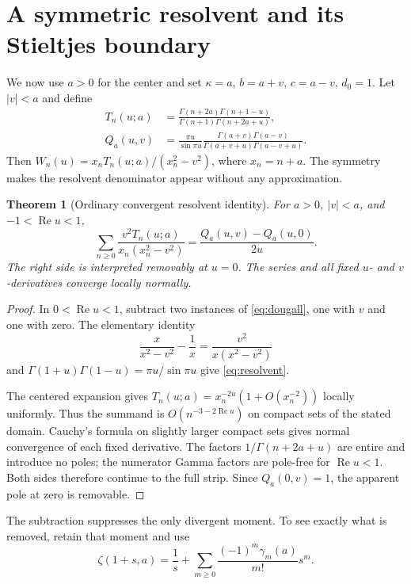 \documentclass[11pt,a4paper]{article}
\numberwithin{equation}{section}
\newtheorem{theorem}{Theorem}[section]
\theoremstyle{definition}\newtheorem{definition}[theorem]{Definition}
\theoremstyle{remark}\newtheorem{remark}[theorem]{Remark}
\newcommand{\Repart}{\operatorname{Re}}
\begin{document}
\section{A symmetric resolvent and its Stieltjes boundary}
\label{sec:resolvent}
We now use $a>0$ for the center and set $\kappa=a$, $b=a+v$,
$c=a-v$, $d_0=1$. Let $|v|<a$ and define
\begin{align}
 T_n(u;a)&=\frac{\Gamma(n+2a)\Gamma(n+1-u)}
                    {\Gamma(n+1)\Gamma(n+2a+u)},\label{eq:Tn}\\
 Q_a(u,v)&=\frac{\pi u}{\sin\pi u}
 \frac{\Gamma(a+v)\Gamma(a-v)}
      {\Gamma(a+v+u)\Gamma(a-v+u)}.\label{eq:Qa}
\end{align}
Then $W_n(u)=x_nT_n(u;a)/(x_n^2-v^2)$, where $x_n=n+a$.
The symmetry makes the resolvent denominator appear without any
approximation.

\begin{theorem}[Ordinary convergent resolvent identity]
\label{thm:resolvent}
For $a>0$, $|v|<a$, and $-1<\Repart u<1$,
\begin{equation}
 \sum_{n\ge0}\frac{v^2T_n(u;a)}{x_n(x_n^2-v^2)}
       =\frac{Q_a(u,v)-Q_a(u,0)}{2u}.
 \label{eq:resolvent}
\end{equation}
The right side is interpreted removably at $u=0$. The series and
all fixed $u$- and $v$-derivatives converge locally normally.
\end{theorem}
\begin{proof}
In $0<\Repart u<1$, subtract two instances of
\eqref{eq:dougall}, one with $v$ and one with zero. The elementary
identity
\[
 \frac{x}{x^2-v^2}-\frac1x=\frac{v^2}{x(x^2-v^2)}
\]
and $\Gamma(1+u)\Gamma(1-u)=\pi u/\sin\pi u$ give
\eqref{eq:resolvent}.

The centered expansion gives
$T_n(u;a)=x_n^{-2u}(1+O(x_n^{-2}))$ locally uniformly.
Thus the summand is $O(n^{-3-2\Repart u})$ on compact sets of the
stated domain. Cauchy's formula on slightly larger compact sets gives
normal convergence of each fixed derivative. The factors
$1/\Gamma(n+2a+u)$ are entire and introduce no poles; the numerator
Gamma factors are pole-free for $\Repart u<1$. Both sides therefore
continue to the full strip. Since $Q_a(0,v)=1$, the apparent pole
at zero is removable.
\end{proof}

The subtraction suppresses the only divergent moment. To see exactly
what is removed, retain that moment and use
\begin{equation}
 \zeta(1+s,a)=\frac1s+\sum_{m\ge0}\frac{(-1)^m\gamma_m(a)}{m!}s^m.
 \label{eq:stieltjes-convention}
\end{equation}
\end{document}

